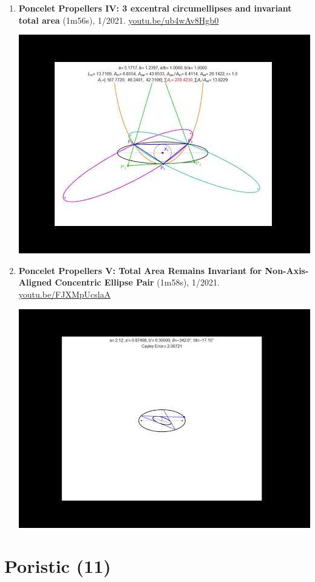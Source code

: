 \documentclass[12pt]{article}
\begin{document}
\begin{enumerate}[resume]
% 
\item \textbf{Poncelet Propellers IV: 3 excentral circumellipses and invariant total area} (1m56s), 1/2021. \href{https://youtu.be/ub4wAv8Hgb0}{\url{youtu.be/ub4wAv8Hgb0}}
\begin{center}\includegraphics[width=.5\textwidth]{pics/ub4wAv8Hgb0.jpg}\end{center}
% 
\item \textbf{Poncelet Propellers V: Total Area Remains Invariant for Non-Axis-Aligned Concentric Ellipse Pair} (1m58s), 1/2021. \href{https://youtu.be/FJXMpUcslaA}{\url{youtu.be/FJXMpUcslaA}}
\begin{center}\includegraphics[width=.5\textwidth]{pics/FJXMpUcslaA.jpg}\end{center}
% 
\end{enumerate}

\section{Poristic (11)}
\end{document}
